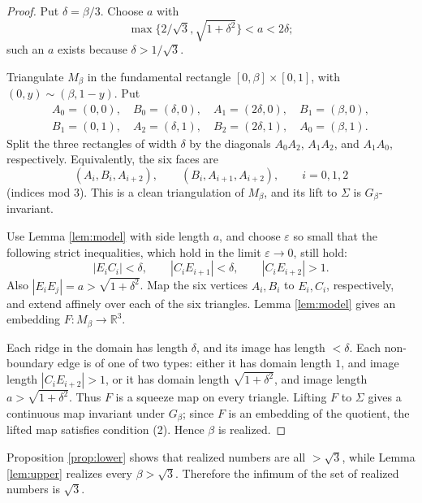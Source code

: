 \documentclass[12pt]{article}
\newcommand{\R}{\mathbb R}
\begin{document}
\begin{proof}
Put \(\delta=\beta/3\).  Choose \(a\) with
\[
        \max\{2/\sqrt3,\sqrt{1+\delta^2}\}<a<2\delta ;
\]
such an \(a\) exists because \(\delta>1/\sqrt3\).

Triangulate \(M_\beta\) in the fundamental rectangle
\([0,\beta]\times[0,1]\), with \((0,y)\sim(\beta,1-y)\).  Put
\[
\begin{array}{c}
A_0=(0,0),\quad B_0=(\delta,0),\quad A_1=(2\delta,0),\quad B_1=(\beta,0),\\
B_1=(0,1),\quad A_2=(\delta,1),\quad B_2=(2\delta,1),\quad A_0=(\beta,1).
\end{array}
\]
Split the three rectangles of width \(\delta\) by the diagonals
\(A_0A_2\), \(A_1A_2\), and \(A_1A_0\), respectively.  Equivalently, the
six faces are
\[
(A_i,B_i,A_{i+2}),\qquad (B_i,A_{i+1},A_{i+2}),\qquad i=0,1,2
\]
(indices mod \(3\)).  This is a clean triangulation of \(M_\beta\), and
its lift to \(\Sigma\) is \(G_\beta\)-invariant.

Use Lemma \ref{lem:model} with side length \(a\), and choose
\(\varepsilon\) so small that the following strict inequalities, which
hold in the limit \(\varepsilon\to0\), still hold:
\[
 |E_iC_i|<\delta,\qquad |C_iE_{i+1}|<\delta,\qquad
 |C_iE_{i+2}|>1 .
\]
Also \(|E_iE_j|=a>\sqrt{1+\delta^2}\).  Map the six vertices
\(A_i,B_i\) to \(E_i,C_i\), respectively, and extend affinely over each
of the six triangles.  Lemma \ref{lem:model} gives an embedding
\(F:M_\beta\to\R^3\).

Each ridge in the domain has length \(\delta\), and its image has length
\(<\delta\).  Each non-boundary edge is of one of two types: either it has
domain length \(1\), and image length \(|C_iE_{i+2}|>1\), or it has domain
length \(\sqrt{1+\delta^2}\), and image length \(a>\sqrt{1+\delta^2}\).
Thus \(F\) is a squeeze map on every triangle.  Lifting \(F\) to
\(\Sigma\) gives a continuous map invariant under \(G_\beta\); since
\(F\) is an embedding of the quotient, the lifted map satisfies condition
(2).  Hence \(\beta\) is realized.
\end{proof}

Proposition \ref{prop:lower} shows that realized numbers are all
\(>\sqrt3\), while Lemma \ref{lem:upper} realizes every \(\beta>\sqrt3\).
Therefore the infimum of the set of realized numbers is \(\sqrt3\).
\end{document}

